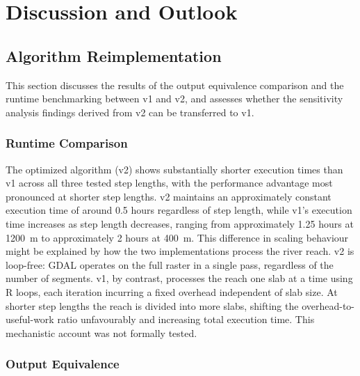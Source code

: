 \chapter{Discussion and Outlook}

\section{Algorithm Reimplementation}
\label{sec:rq1_discussion}

This section discusses the results of the output equivalence comparison 
and the runtime benchmarking between v1 and v2, and assesses whether 
the sensitivity analysis findings derived from v2 can be transferred 
to v1.

\subsection{Runtime Comparison}

The optimized algorithm (v2) shows substantially shorter execution times 
than v1 across all three tested step lengths, with the performance 
advantage most pronounced at shorter step lengths. v2 maintains an 
approximately constant execution time of around 0.5 hours regardless of 
step length, while v1's execution time increases as step length decreases, 
ranging from approximately 1.25 hours at 1200~m to approximately 2 hours 
at 400~m. This difference in scaling behaviour might be explained by how 
the two implementations process the river reach. v2 is loop-free: GDAL 
operates on the full raster in a single pass, regardless of the number of 
segments. v1, by contrast, processes the reach one slab at a 
time using R loops, each iteration incurring a fixed overhead independent 
of slab size. At shorter step lengths the reach is divided into more slabs, 
shifting the overhead-to-useful-work ratio unfavourably and increasing total 
execution time. This mechanistic account was not formally tested.


\subsection{Output Equivalence}

